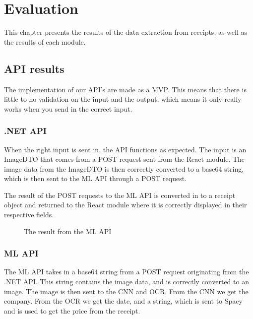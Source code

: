 \chapter{Evaluation}
\label{ch:evaluation}
This chapter presents the results of the data extraction from receipts, as well as the results of each module.

\section{API results}\label{sec:api-results}
The implementation of our API's are made as a MVP\@.
This means that there is little to no validation on the input and the output, which means it only really works when
you send in the correct input.

\subsection{.NET API}\label{subsec:.net-api}

When the right input is sent in, the API functions as expected.
The input is an ImageDTO that comes from a POST request sent from the React module.
The image data from the ImageDTO is then correctly converted to a base64 string, which is then sent to the ML API through a POST request.

The result of the POST requests to the ML API is converted in to a receipt object and returned to the React module
where it is correctly displayed in their respective fields.

\begin{figure}[h]
    \caption{The result from the ML API}
    \label{fig:MLAPIreturnObject}
\end{figure}
\clearpage
\subsection{ML API}\label{subsec:ml-api}
The ML API takes in a base64 string from a POST request originating from the .NET API\@.
This string contains the image data, and is correctly converted to an image.
The image is then sent to the CNN and OCR\@.
From the CNN we get the company.
From the OCR we get the date, and a string, which is sent to Spacy and is used to get the price from the receipt.

